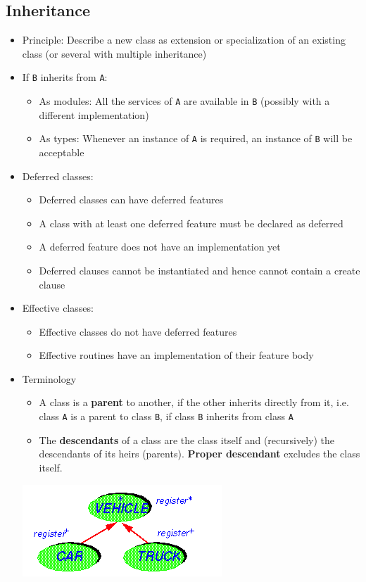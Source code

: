 \documentclass[a4paper]{article}
\newcommand{\inline}[1]{\lstinline!#1!}%
\begin{document}
\subsection{Inheritance}
\begin{itemize}
\item Principle: Describe a new class as extension or specialization of an existing class (or several with multiple inheritance)
\item If \inline{B} inherits from \inline{A}:
\begin{itemize}
\item As modules: All the services of \inline{A} are available in \inline{B} (possibly with a different implementation)
\item As types: Whenever an instance of \inline{A} is required, an instance of \inline{B} will be acceptable
\end{itemize}
\item Deferred classes:
\begin{itemize}
\item Deferred classes can have deferred features
\item A class with at least one deferred feature must be declared as deferred
\item A deferred feature does not have an implementation yet
\item Deferred clauses cannot be instantiated and hence cannot contain a create clause
\end{itemize}
\item Effective classes:
\begin{itemize}
\item Effective classes do not have deferred features
\item Effective routines have an implementation of their feature body
\end{itemize}
\item Terminology
\begin{itemize}
\item A class is a \textbf{parent} to another, if the other inherits directly from it, i.e. class \inline{A} is a parent to class \inline{B}, if class \inline{B} inherits from class \inline{A}
\item The \textbf{descendants} of a class are the class itself and (recursively) the descendants of its heirs (parents). \textbf{Proper descendant} excludes the class itself.
\end{itemize}
\begin{center}
\includegraphics[scale=1]{Figures/inheritance_example.png}

\end{center}
\end{itemize}
\end{document}
